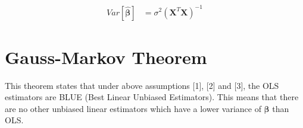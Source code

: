 \documentclass[11pt, a4paper]{article}
\begin{document}
\begin{align*}
	Var[\boldsymbol{\hat{\beta}}] & = \sigma^2 (\mathbf{X}^T\mathbf{X})^{-1} 
\end{align*}

\section{Gauss-Markov Theorem}

This theorem states that under above assumptions [1], [2] and [3], the OLS estimators are BLUE (Best Linear Unbiased Estimators). This means that there are no other unbiased linear estimators which have a lower variance of $\boldsymbol{\beta}$ than OLS.  
\end{document}
